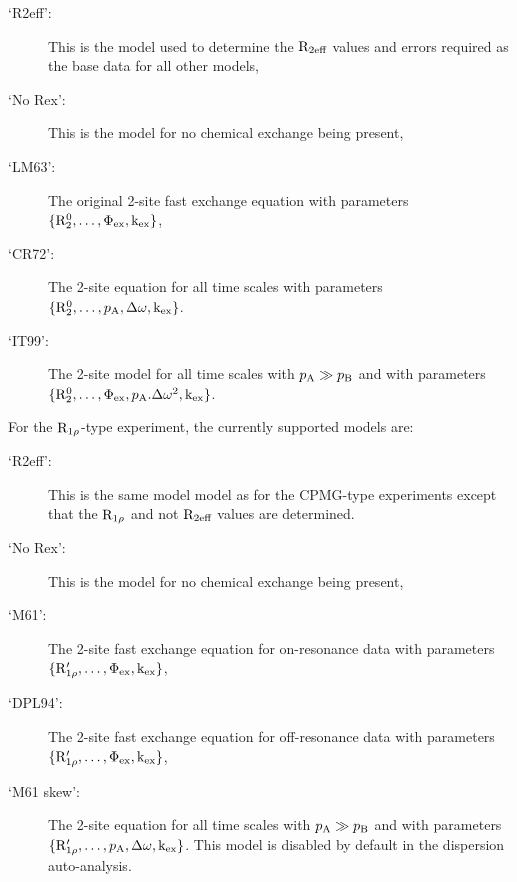 \begin{description}
\item[`R2eff':]  This is the model used to determine the $\mathrm{R}_{2\textrm{eff}}$ values and errors required as the base data for all other models,
\item[`No Rex':]  This is the model for no chemical exchange being present,
\item[`LM63':]  The original \citet{LuzMeiboom63} 2-site fast exchange equation with parameters $\{\mathrm{R}_2^0, \dots, \Phi_\textrm{ex}, \textrm{k}_\textrm{ex}\}$,
\item[`CR72':]  The \citet{CarverRichards72} 2-site equation for all time scales with parameters $\{\mathrm{R}_2^0, \dots, p_\textrm{A}, \Delta\omega, \textrm{k}_\textrm{ex}\}$.
\item[`IT99':]  The \citet{IshimaTorchia99} 2-site model for all time scales with $p_\textrm{A} \gg p_\textrm{B}$ and with parameters $\{\mathrm{R}_2^0, \dots, \Phi_\textrm{ex}, p_\textrm{A}.\Delta\omega^2, \textrm{k}_\textrm{ex}\}$.
\end{description}

For the $\mathrm{R}_{1\rho}$-type experiment, the currently supported models are:

\begin{description}
\item[`R2eff':]  This is the same model model as for the CPMG-type experiments except that the $\mathrm{R}_{1\rho}$ and not $\mathrm{R}_{2\textrm{eff}}$ values are determined.
\item[`No Rex':]  This is the model for no chemical exchange being present,
\item[`M61':]  The \citet{Meiboom61} 2-site fast exchange equation for on-resonance data with parameters $\{\mathrm{R}_{1\rho}', \dots, \Phi_\textrm{ex}, \textrm{k}_\textrm{ex}\}$,
\item[`DPL94':]  The \citet{Davis94} 2-site fast exchange equation for off-resonance data with parameters $\{\mathrm{R}_{1\rho}', \dots, \Phi_\textrm{ex}, \textrm{k}_\textrm{ex}\}$,
\item[`M61 skew':]  The \citet{Meiboom61} 2-site equation for all time scales with $p_\textrm{A} \gg p_\textrm{B}$ and with parameters $\{\mathrm{R}_{1\rho}', \dots, p_\textrm{A}, \Delta\omega, \textrm{k}_\textrm{ex}\}$.  This model is disabled by default in the dispersion auto-analysis.
\end{description}

